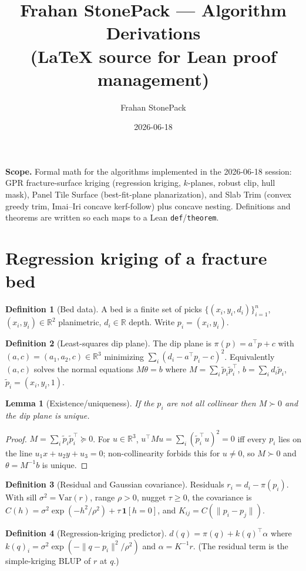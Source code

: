 \documentclass[11pt]{article}
\title{Frahan StonePack — Algorithm Derivations\\ \large (LaTeX source for Lean proof management)}
\author{Frahan StonePack}\date{2026-06-18}
\theoremstyle{definition}\newtheorem{definition}{Definition}[section]
\theoremstyle{plain}\newtheorem{theorem}{Theorem}[section]
\newtheorem{lemma}[theorem]{Lemma}\newtheorem{proposition}[theorem]{Proposition}
\newcommand{\R}{\mathbb{R}}\newcommand{\Z}{\mathbb{Z}}\newcommand{\Norm}[1]{\lVert #1\rVert}
\begin{document}
\maketitle
\noindent\textbf{Scope.} Formal math for the algorithms implemented in the 2026-06-18 session:
GPR fracture-surface kriging (regression kriging, $k$-planes, robust clip, hull mask), Panel Tile
Surface (best-fit-plane planarization), and Slab Trim (convex greedy trim, Imai--Iri concave kerf-follow)
plus concave nesting. Definitions and theorems are written so each maps to a Lean \texttt{def}/\texttt{theorem}.

\section{Regression kriging of a fracture bed}
\begin{definition}[Bed data]
A bed is a finite set of picks $\{(x_i,y_i,d_i)\}_{i=1}^n$, $(x_i,y_i)\in\R^2$ planimetric, $d_i\in\R$ depth.
Write $p_i=(x_i,y_i)$.
\end{definition}
\begin{definition}[Least-squares dip plane]
The dip plane is $\pi(p)=a^\top p + c$ with $(a,c)=(a_1,a_2,c)\in\R^3$ minimizing
$\sum_i (d_i-a^\top p_i-c)^2$. Equivalently $(a,c)$ solves the normal equations $M\theta=b$ where
$M=\sum_i \tilde p_i\tilde p_i^\top$, $b=\sum_i d_i\tilde p_i$, $\tilde p_i=(x_i,y_i,1)$.
\end{definition}
\begin{lemma}[Existence/uniqueness]\label{lem:plane}
If the $p_i$ are not all collinear then $M\succ0$ and the dip plane is unique.
\end{lemma}
\begin{proof}
$M=\sum_i\tilde p_i\tilde p_i^\top\succeq0$. For $u\in\R^3$, $u^\top M u=\sum_i(\tilde p_i^\top u)^2=0$
iff every $p_i$ lies on the line $u_1x+u_2y+u_3=0$; non-collinearity forbids this for $u\neq0$, so
$M\succ0$ and $\theta=M^{-1}b$ is unique.
\end{proof}
\begin{definition}[Residual and Gaussian covariance]
Residuals $r_i=d_i-\pi(p_i)$. With sill $\sigma^2=\mathrm{Var}(r)$, range $\rho>0$, nugget $\tau\ge0$, the
covariance is $C(h)=\sigma^2\exp(-h^2/\rho^2)+\tau\,\mathbf 1[h=0]$, and $K_{ij}=C(\Norm{p_i-p_j})$.
\end{definition}
\begin{definition}[Regression-kriging predictor]
$\hat d(q)=\pi(q)+k(q)^\top\alpha$ where $k(q)_i=\sigma^2\exp(-\Norm{q-p_i}^2/\rho^2)$ and $\alpha=K^{-1}r$.
(The residual term is the simple-kriging BLUP of $r$ at $q$.)
\end{definition}
\end{document}
